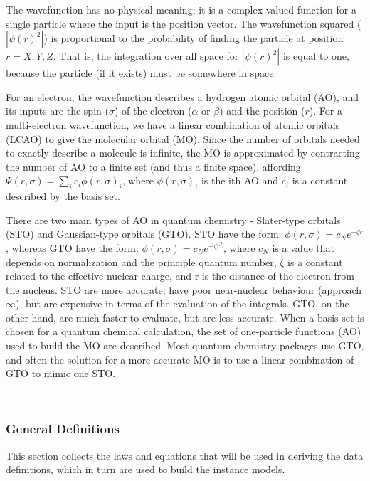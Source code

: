 \documentclass[12pt]{article}
\begin{document}
The wavefunction has no physical meaning; it is a complex-valued function for a 
single particle where the input is the position vector. The wavefunction 
squared ($|\psi(r)^2|$) is proportional to the probability of finding the 
particle at position $r = X,Y,Z$. That is, the integration over all space for 
$|\psi(r)^2|$ is equal to one, because the particle (if it exists) must be 
somewhere in space.

For an electron, the wavefunction describes a hydrogen atomic orbital (AO), and 
its inputs are the spin ($\sigma$) of the electron ($\alpha$ or $\beta$) and 
the position ($r$). For a multi-electron wavefunction, we have a linear 
combination of atomic orbitals (LCAO) to give the molecular orbital (MO). Since 
the number of orbitals needed to exactly describe a molecule is infinite, the 
MO is approximated by contracting the number of AO to a finite set (and thus a 
finite space), affording $\Psi(r, \sigma) = \sum\limits_{i}c_i 
\phi(r,\sigma)_i$, where $\phi(r,\sigma)_i$ is the ith AO and $c_i$ is a 
constant  
described by the basis set.

There are two main types of AO in quantum chemistry - Slater-type orbitals 
(STO) and Gaussian-type orbitals (GTO). STO have the form: $\phi(r,\sigma) = 
c_Ne^{-\zeta r}$, whereas GTO have the form: $\phi(r,\sigma) = c_Ne^{-\zeta 
r^2}$, 
where $c_N$ is a value that depends on normalization and 
the principle quantum 
number, $\zeta$ is a constant related to the effective nuclear charge, and r is 
the distance of the electron from the nucleus. STO are more accurate, have poor 
near-nuclear behaviour (approach $\infty$), but are expensive in terms of the 
evaluation of the integrals. GTO, on the other hand, are much faster to 
evaluate, but are less accurate. When a basis set is chosen for a quantum 
chemical calculation, the set of one-particle functions (AO) used to build the 
MO are described. Most quantum chemistry packages use GTO, and often the 
solution for a more accurate MO is to use a linear combination of GTO to mimic 
one STO.

~\newline

\subsubsection{General Definitions}\label{sec_gendef}

This section collects the laws and equations that will be used in deriving the
data definitions, which in turn are used to build the instance models.
\end{document}
